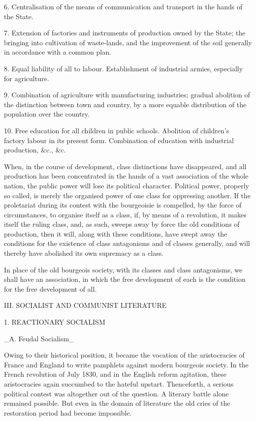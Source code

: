 6. Centralisation of the means of communication and transport in the
hands of the State.

7. Extension of factories and instruments of production owned by the
State; the bringing into cultivation of waste-lands, and the
improvement of the soil generally in accordance with a common plan.

8. Equal liability of all to labour. Establishment of industrial
armies, especially for agriculture.

9. Combination of agriculture with manufacturing industries; gradual
abolition of the distinction between town and country, by a more
equable distribution of the population over the country.

10. Free education for all children in public schools.     Abolition of
children’s factory labour in its present form.     Combination of
education with industrial production, &c., &c.

When, in the course of development, class distinctions have
disappeared, and all production has been concentrated in the hands of a
vast association of the whole nation, the public power will lose its
political character. Political power, properly so called, is merely the
organised power of one class for oppressing another. If the proletariat
during its contest with the bourgeoisie is compelled, by the force of
circumstances, to organise itself as a class, if, by means of a
revolution, it makes itself the ruling class, and, as such, sweeps away
by force the old conditions of production, then it will, along with
these conditions, have swept away the conditions for the existence of
class antagonisms and of classes generally, and will thereby have
abolished its own supremacy as a class.

In place of the old bourgeois society, with its classes and class
antagonisms, we shall have an association, in which the free
development of each is the condition for the free development of all.




III.
SOCIALIST AND COMMUNIST LITERATURE

1. REACTIONARY SOCIALISM

_A. Feudal Socialism_


Owing to their historical position, it became the vocation of the
aristocracies of France and England to write pamphlets against modern
bourgeois society. In the French revolution of July 1830, and in the
English reform agitation, these aristocracies again succumbed to the
hateful upstart. Thenceforth, a serious political contest was
altogether out of the question. A literary battle alone remained
possible. But even in the domain of literature the old cries of the
restoration period had become impossible.

